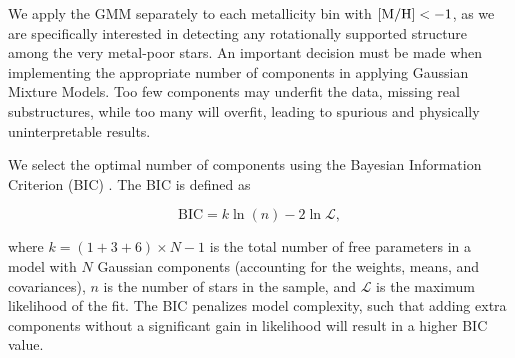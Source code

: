 \documentclass[a4paper,12pt]{article}
\begin{document}
We apply the GMM separately to each metallicity bin with ${\rm [M/H]} < -1$, as we are specifically 
interested in detecting any rotationally supported structure among the very metal-poor stars. An important decision 
must be made when implementing the appropriate number of components in applying Gaussian Mixture Models. Too few 
components may underfit the data, missing real substructures, while too many will overfit, leading to spurious 
and physically uninterpretable results.

We select the optimal number of components using the Bayesian Information Criterion (BIC) \citealt{Schwarz1978}. 
The BIC is defined as

\begin{equation}
\mathrm{BIC} = k \ln(n) - 2 \ln \mathcal{L},
\end{equation}

where $k = (1 + 3 + 6) \times N - 1$ is the total number of free parameters in a model with $N$ Gaussian components 
(accounting for the weights, means, and covariances), $n$ is the number of stars in the sample, and $\mathcal{L}$ 
is the maximum likelihood of the fit. The BIC penalizes model complexity, such that adding extra components 
without a significant gain in likelihood will result in a higher BIC value.
\end{document}
